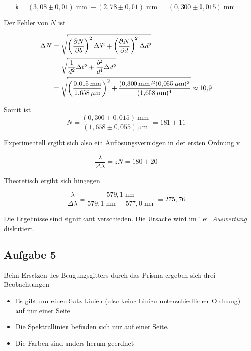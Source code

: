 \documentclass[a4paper,german,12pt,smallheadings]{scrartcl}
\begin{document}
\begin{equation}
  b = (3{,}08 \pm 0{,}01) \operatorname{mm} - (2{,}78\pm0{,}01) \operatorname{mm}
    = (0{,}300 \pm 0{,}015) \operatorname{mm}
\end{equation}

Der Fehler von $N$ ist

\begin{align*}
  \Delta N &= \sqrt{
    \del{\frac{\partial N}{\partial b}}^2 \Delta b^2 +
    \del{\frac{\partial N}{\partial d}}^2 \Delta d^2
  } \\ &= \sqrt{
    \frac{1}{d^2} \Delta b^2 +
    \frac{b^2}{d^4} \Delta d^2
  } \\ & = \sqrt{
    \del{\frac{0{,}015 \operatorname{mm}}{1{,}658 \operatorname{\mu m}}}^2 +
    \frac{(0{,}300 \operatorname{mm})^2 (0{,}055 \operatorname{\mu m})^2}{
      (1{,}658 \operatorname{\mu m})^4
    }
  } \approx 10{,}9
\end{align*}


Somit ist
\begin{equation}
  N = \frac{(0{,}300 \pm 0{,}015) \operatorname{mm}}{(1{,}658\pm0{,}055) \operatorname{\mu m}}
  = 181\pm11
\end{equation}

Experimentell ergibt sich also ein Auflösungsvermögen in der ersten Ordnung v

\begin{equation}
  \frac{\lambda}{\Delta \lambda} = z N = 180\pm20
\end{equation}

Theoretisch ergibt sich hingegen

\begin{equation}
  \frac{\lambda}{\Delta \lambda} = \frac{579{,}1 \operatorname{nm}}{579{,}1 \operatorname{nm} - 577{,}0 \operatorname{nm}} = 275{,}76
\end{equation}

Die Ergebnisse sind signifikant verschieden. Die Ursache wird im Teil
\textit{Auswertung} diskutiert.

\subsection{Aufgabe 5}
Beim Ersetzen des Beugungsgitters durch das Prisma ergeben sich drei
Beobachtungen:

\begin{itemize}
  \item Es gibt nur einen Satz Linien (also keine Linien unterschiedlicher
    Ordnung) auf nur einer Seite
  \item Die Spektrallinien befinden sich nur auf einer Seite.
  \item Die Farben sind anders herum geordnet
\end{itemize}
\end{document}
